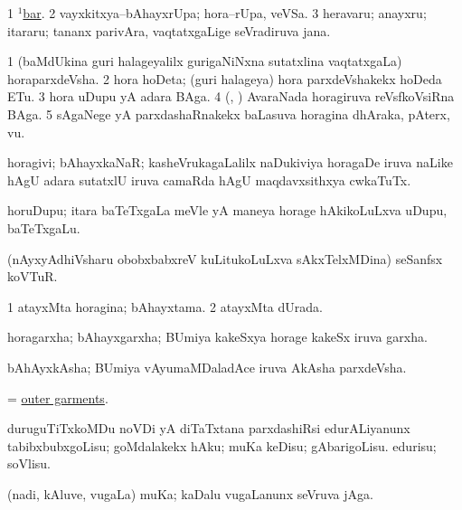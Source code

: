 \noindent
\gl{\pagu}
\bmng
\bnum
\num{1}  \hyperref{kandict_b.pdf}{B}{bar(1) pagu(4)}{$^1$bar}. 
\num{2}  vayxkitxya--bAhayxrUpa; hora--rUpa, veVSa. 
\num{3}  heravaru; anayxru; itararu; tananx parivAra, vaqtatxgaLige seVradiruva jana. 
\enum
\emng
\eentry

\bentry
{}
\gl{\nA}
\bmng
\bnum
\num{1} (baMdUkina guri halageyalilx gurigaNiNxna sutatxlina vaqtatxgaLa) horaparxdeVsha. 
\num{2} hora hoDeta; (guri halageya) hora parxdeVshakekx hoDeda ETu. 
\num{3} hora uDupu yA adara BAga. 
\num{4} (\AseTxrXV, \ashi) AvaraNada horagiruva reVsfkoVsiRna BAga. 
\num{5} sAgaNege yA parxdashaRnakekx baLasuva horagina dhAraka, pAterx, \mo vu. 
\enum
\emng
\eentry

\bentry
{}
\gl{\nA}
\bmng
horagivi; bAhayxkaNaR; kasheVrukagaLalilx naDukiviya horagaDe iruva naLike hAgU adara sutatxlU iruva camaRda hAgU maqdavxsithxya cwkaTuTx. 
\emng
\eentry

\bentry
{}
\gl{\nA}
\bmng
horuDupu; itara baTeTxgaLa meVle yA maneya horage hAkikoLuLxva uDupu, baTeTxgaLu. 
\emng
\eentry

\bentry
{}
\gl{\nA}
\bmng
(nAyxyAdhiVsharu obobxbabxreV kuLitukoLuLxva sAkxTelxMDina) seSanfsx koVTuR. 
\emng
\eentry

\bentry
{}
\gl{\gu}
\bmng
\bnum
\num{1} atayxMta horagina; bAhayxtama. 
\num{2} atayxMta dUrada. 
\enum
\emng
\eentry

\bentry
{}
\gl{\nA}
\bmng
horagarxha; bAhayxgarxha; BUmiya kakeSxya horage kakeSx iruva garxha. 
\emng
\eentry

\bentry
{}
\gl{\nA}
\bmng
bAhAyxkAsha; BUmiya vAyumaMDaladAce iruva AkAsha parxdeVsha. 
\emng
\eentry

\bentry
{}
\gl{\nA}
\bmng
= \hyperlink{outer garments}{outer garments}. 
\emng
\eentry

\bentry
{}
\gl{\sakirx}
\bmng
duruguTiTxkoMDu noVDi yA diTaTxtana parxdashiRsi edurALiyanunx 
\banum
{} tabibxbubxgoLisu; goMdalakekx hAku; muKa keDisu; gAbarigoLisu. 
 edurisu; soVlisu. 
\eanum
\emng
\eentry

\bentry
{}
\gl{\nA}
\bmng
(nadi, kAluve, \mo vugaLa) muKa; kaDalu \mo vugaLanunx seVruva jAga. 
\emng
\eentry

